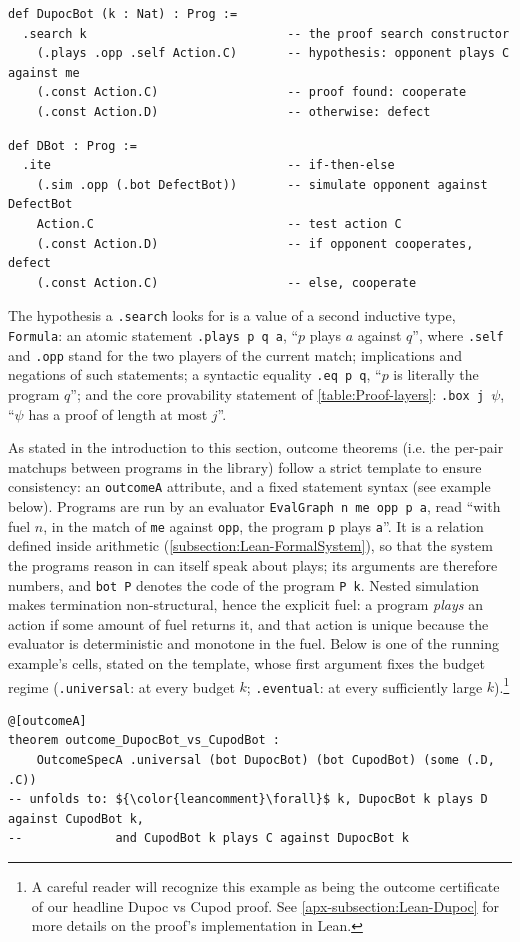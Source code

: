 \documentclass[twoside,11pt]{article}
\begin{document}
\begin{lstlisting}[style=pdlean]
def DupocBot (k : Nat) : Prog :=
  .search k                            -- the proof search constructor
    (.plays .opp .self Action.C)       -- hypothesis: opponent plays C against me
    (.const Action.C)                  -- proof found: cooperate
    (.const Action.D)                  -- otherwise: defect
\end{lstlisting}
\begin{lstlisting}[style=pdlean]
def DBot : Prog :=
  .ite                                 -- if-then-else
    (.sim .opp (.bot DefectBot))       -- simulate opponent against DefectBot
    Action.C                           -- test action C
    (.const Action.D)                  -- if opponent cooperates, defect
    (.const Action.C)                  -- else, cooperate
\end{lstlisting}

The hypothesis a \texttt{.search} looks for is a value of a second inductive type, \texttt{Formula}: an atomic statement \texttt{.plays p q a}, \enquote{$p$ plays $a$ against $q$}, where \texttt{.self} and \texttt{.opp} stand for the two players of the current match; implications and negations of such statements; a syntactic equality \texttt{.eq p q}, \enquote{$p$ is literally the program $q$}; and the core provability statement of \cref{table:Proof-layers}: \texttt{.box j $\psi$}, \enquote{$\psi$ has a proof of length at most $j$}.

As stated in the introduction to this section, outcome theorems (i.e. the per-pair matchups between programs in the library) follow a strict template to ensure consistency: an \texttt{outcomeA} attribute, and a fixed statement syntax (see example below). Programs are run by an evaluator \texttt{EvalGraph n me opp p a}, read \enquote{with fuel $n$, in the match of \texttt{me} against \texttt{opp}, the program \texttt{p} plays \texttt{a}}. It is a relation defined inside arithmetic (\cref{subsection:Lean-FormalSystem}), so that the system the programs reason in can itself speak about plays; its arguments are therefore numbers, and \texttt{bot P} denotes the code of the program \texttt{P k}. Nested simulation makes termination non-structural, hence the explicit fuel: a program \emph{plays} an action if some amount of fuel returns it, and that action is unique because the evaluator is deterministic and monotone in the fuel. Below is one of the running example's cells, stated on the template, whose first argument fixes the budget regime (\texttt{.universal}: at every budget $k$; \texttt{.eventual}: at every sufficiently large $k$).\footnote{A careful reader will recognize this example as being the outcome certificate of our headline Dupoc vs Cupod proof. See \cref{apx-subsection:Lean-Dupoc} for more details on the proof's implementation in Lean.}
\begin{lstlisting}[style=pdlean, mathescape=true]
@[outcomeA]
theorem outcome_DupocBot_vs_CupodBot :
    OutcomeSpecA .universal (bot DupocBot) (bot CupodBot) (some (.D, .C))
-- unfolds to: ${\color{leancomment}\forall}$ k, DupocBot k plays D against CupodBot k,
--             and CupodBot k plays C against DupocBot k
\end{lstlisting}
\end{document}
